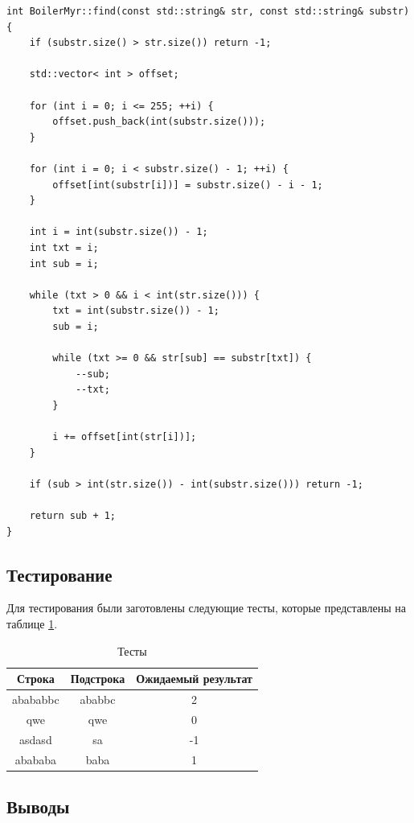 \documentclass[a4paper,12pt]{article}
\begin{document}
\begin{lstlisting}[caption=Алгоритм Бойлера-Мура,label=lst:bm]
int BoilerMyr::find(const std::string& str, const std::string& substr)
{
    if (substr.size() > str.size()) return -1;

    std::vector< int > offset;

    for (int i = 0; i <= 255; ++i) {
        offset.push_back(int(substr.size()));
    }

    for (int i = 0; i < substr.size() - 1; ++i) {
        offset[int(substr[i])] = substr.size() - i - 1;
    }

    int i = int(substr.size()) - 1;
    int txt = i;
    int sub = i;

    while (txt > 0 && i < int(str.size())) {
        txt = int(substr.size()) - 1;
        sub = i;

        while (txt >= 0 && str[sub] == substr[txt]) {
            --sub;
            --txt;
        }

        i += offset[int(str[i])];
    }

    if (sub > int(str.size()) - int(substr.size())) return -1;

    return sub + 1;
}
\end{lstlisting}

\subsection{Тестирование}

Для тестирования были заготовлены следующие тесты, которые представлены
на таблице \ref{table:test}.

\begin{table}[H]
    \caption{Тесты}
    \label{table:test}
    \centering
    \begin{tabular}{|c|c||c|}
        \hline
        Строка & Подстрока & Ожидаемый результат \\
        \hline
        \hline
        abababbc & ababbc & 2 \\
        \hline
        qwe & qwe & 0 \\
        \hline
        asdasd & sa & -1 \\
        \hline
        abababa & baba & 1 \\
        \hline
    \end{tabular}
\end{table}

\subsection{Выводы}
\end{document}
